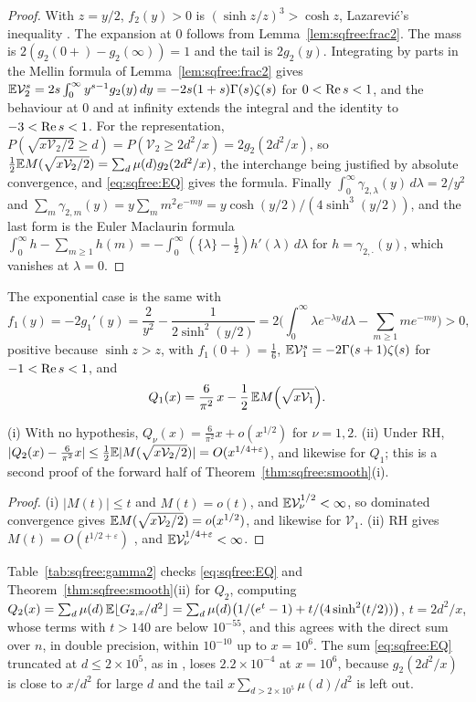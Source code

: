 \begin{proof}
With $z=y/2$, $f_2(y)>0$ is $(\sinh z/z)^3>\cosh z$, Lazarevi\'c's inequality \cite{Lazarevic66}. The expansion at $0$ follows from Lemma~\ref{lem:sqfree:frac2}. The mass is $2(g_2(0+)-g_2(\infty))=1$ and the tail is $2g_2(y)$. Integrating by parts in the Mellin formula of Lemma~\ref{lem:sqfree:frac2} gives $\mathbb{E}\mathcal V_2^s=2s\int_0^\infty y^{s-1}g_2(y)\,dy=-2s(1+s)\Gamma(s)\zeta(s)$ for $0<\operatorname{Re} s<1$, and the behaviour at $0$ and at infinity extends the integral and the identity to $-3<\operatorname{Re} s<1$. For the representation, $P(\sqrt{x\mathcal V_2/2}\ge d)=P(\mathcal V_2\ge2d^2/x)=2g_2(2d^2/x)$, so $\frac12\mathbb{E} M(\sqrt{x\mathcal V_2/2})=\sum_d\mu(d)g_2(2d^2/x)$, the interchange being justified by absolute convergence, and \eqref{eq:sqfree:EQ} gives the formula. Finally $\int_0^\infty\gamma_{2,\lambda}(y)\,d\lambda=2/y^2$ and $\sum_m\gamma_{2,m}(y)=y\sum_mm^2e^{-my}=y\cosh(y/2)/(4\sinh^3(y/2))$, and the last form is the Euler Maclaurin formula $\int_0^\infty h-\sum_{m\ge1}h(m)=-\int_0^\infty(\{\lambda\}-\frac12)h'(\lambda)\,d\lambda$ for $h=\gamma_{2,\cdot}(y)$, which vanishes at $\lambda=0$.
\end{proof}

The exponential case is the same with
\[
f_1(y)=-2g_1'(y)=\frac2{y^2}-\frac1{2\sinh^2(y/2)}=2\Big(\int_0^\infty\lambda e^{-\lambda y}d\lambda-\sum_{m\ge1}me^{-my}\Big)>0,
\]
positive because $\sinh z>z$, with $f_1(0+)=\frac16$, $\mathbb{E}\mathcal V_1^s=-2\Gamma(s+1)\zeta(s)$ for $-1<\operatorname{Re} s<1$, and
\[
Q_1(x)=\frac6{\pi^2}\,x-\frac12\,\mathbb{E} M\Big(\sqrt{x\mathcal V_1}\Big).
\]

\begin{corollary}\label{cor:sqfree:mertens}
\textup{(i)} With no hypothesis, $Q_\nu(x)=\frac6{\pi^2}x+o(x^{1/2})$ for $\nu=1,2$. \textup{(ii)} Under RH, $|Q_2(x)-\frac6{\pi^2}x|\le\frac12\mathbb{E}|M(\sqrt{x\mathcal V_2/2})|=O(x^{1/4+\varepsilon})$, and likewise for $Q_1$; this is a second proof of the forward half of Theorem~\ref{thm:sqfree:smooth}(i).
\end{corollary}

\begin{proof}
(i) $|M(t)|\le t$ and $M(t)=o(t)$, and $\mathbb{E}\mathcal V_\nu^{1/2}<\infty$, so dominated convergence gives $\mathbb{E} M(\sqrt{x\mathcal V_2/2})=o(x^{1/2})$, and likewise for $\mathcal V_1$. (ii) RH gives $M(t)=O(t^{1/2+\varepsilon})$ \cite[Section~14.25]{Titchmarsh}, and $\mathbb{E}\mathcal V_\nu^{1/4+\varepsilon}<\infty$.
\end{proof}

Table~\ref{tab:sqfree:gamma2} checks \eqref{eq:sqfree:EQ} and Theorem~\ref{thm:sqfree:smooth}(ii) for $Q_2$, computing $Q_2(x)=\sum_d\mu(d)\,\mathbb{E}\lfloor G_{2,x}/d^2\rfloor=\sum_d\mu(d)\big(1/(e^t-1)+t/(4\sinh^2(t/2))\big)$, $t=2d^2/x$, whose terms with $t>140$ are below $10^{-55}$, and this agrees with the direct sum over $n$, in double precision, within $10^{-10}$ up to $x=10^6$. The sum \eqref{eq:sqfree:EQ} truncated at $d\le2\times10^5$, as in \cite{P26sqf}, loses $2.2\times10^{-4}$ at $x=10^6$, because $g_2(2d^2/x)$ is close to $x/d^2$ for large $d$ and the tail $x\sum_{d>2\times10^5}\mu(d)/d^2$ is left out.

